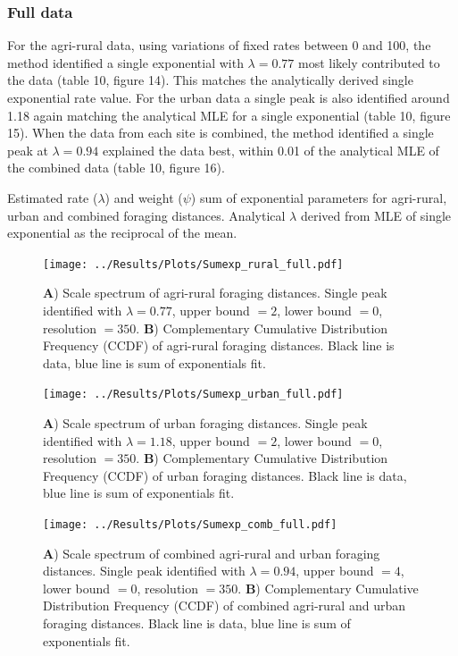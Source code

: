 \documentclass[11pt,usenames,dvipsnames,a4paper]{article}
\begin{document}
\subsubsection{Full data}
\begin{linenumbers}
\hspace{\parindent}
For the agri-rural data, using variations of fixed rates between 0 and 100, the method identified a single exponential with $\lambda = 0.77$ most likely contributed to the data (table 10, figure 14). This matches the analytically derived single exponential rate value. For the urban data a single peak is also identified around 1.18 again matching the analytical MLE for a single exponential (table 10, figure 15). When the data from each site is combined, the method identified a single peak at $\lambda = 0.94$ explained the data best, within 0.01 of the analytical MLE of the combined data (table 10, figure 16). 
\end{linenumbers}

\begin{table}[H]
	\centering
	\caption{Estimated rate ($\lambda$) and weight ($\psi$) sum of exponential parameters for agri-rural, urban and combined foraging distances. Analytical $\lambda$ derived from MLE of single exponential as the reciprocal of the mean.}
	
\end{table}


\begin{figure}[H]
	\centering
	\texttt{[image: ../Results/Plots/Sumexp\_rural\_full.pdf]}
	\caption{\textbf{A}) Scale spectrum of agri-rural foraging distances. Single peak identified with $\lambda = 0.77$, upper bound $= 2$, lower bound $= 0$, resolution $= 350$. \textbf{B}) Complementary Cumulative Distribution Frequency (CCDF) of agri-rural foraging distances. Black line is data, blue line is sum of exponentials fit.}
\end{figure}

\begin{figure}[H]
	\centering
	\texttt{[image: ../Results/Plots/Sumexp\_urban\_full.pdf]}
	\caption{\textbf{A}) Scale spectrum of urban foraging distances. Single peak identified with $\lambda = 1.18$, upper bound $= 2$, lower bound $= 0$, resolution $= 350$. \textbf{B}) Complementary Cumulative Distribution Frequency (CCDF) of urban foraging distances. Black line is data, blue line is sum of exponentials fit.}
\end{figure}

\begin{figure}[H]
	\centering
	\texttt{[image: ../Results/Plots/Sumexp\_comb\_full.pdf]}
	\caption{\textbf{A}) Scale spectrum of combined agri-rural and urban foraging distances. Single peak identified with $\lambda = 0.94$, upper bound $= 4$, lower bound $= 0$, resolution $= 350$. \textbf{B}) Complementary Cumulative Distribution Frequency (CCDF) of combined agri-rural and urban foraging distances. Black line is data, blue line is sum of exponentials fit.}
\end{figure}
\end{document}
